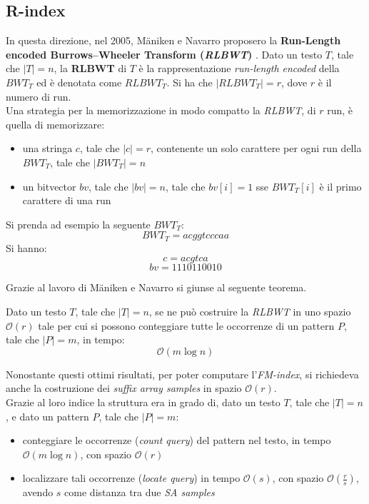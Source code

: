 \subsection{R-index}
In questa direzione, nel 2005, M\"{a}niken e Navarro proposero la
\textbf{Run-Length encoded Burrows–Wheeler Transform (\textit{RLBWT})}
\cite{rlbwt}.
Dato un testo $T$, tale che $|T|=n$, la \textbf{RLBWT} di $T$ è la
rappresentazione \textit{run-length encoded} della $BWT_T$ ed è denotata come
$RLBWT_T$. Si ha  che $|RLBWT_T|=r$, dove $r$ è il numero di run.\\
Una strategia per la memorizzazione in modo compatto la \textit{RLBWT}, di $r$
run, è quella di memorizzare:
\begin{itemize}
  \item una stringa $c$, tale che $|c|=r$, contenente un solo carattere per ogni
  run della $BWT_T$, tale che $|BWT_T|=n$
  \item un bitvector $bv$, tale che $|bv|=n$, tale che $bv[i]=1$ sse $BWT_T[i]$
  è il primo carattere di una run
\end{itemize}
\begin{esempio}
  Si prenda ad esempio la seguente $BWT_T$:
  \[BWT_T=acggtcccaa\]
  Si hanno:
  \[c=acgtca\]
  \[bv=1110110010\]
\end{esempio}
Grazie al lavoro di M\"{a}niken e Navarro si giunse al seguente teorema.
\begin{teorema}
  Dato un testo $T$, tale che $|T|=n$, se ne può costruire la \textit{RLBWT} in
  uno spazio $\mathcal{O}(r)$ tale per cui si possono conteggiare tutte le
  occorrenze di un pattern $P$, tale che $|P|=m$, in tempo:
  \[\mathcal{O}(m\log n)\]
\end{teorema}
Nonostante questi ottimi risultati, per poter computare l'\textit{FM-index}, si
richiedeva anche la costruzione dei \textit{suffix array samples} in spazio
$\mathcal{O}(r)$. \\
Grazie al loro indice la struttura era in grado di, dato un testo $T$, tale che
$|T|=n$, e dato un pattern $P$, tale che $|P|=m$: 
\begin{itemize}
  \item conteggiare le occorrenze (\textit{count query}) del pattern nel testo,
  in tempo $\mathcal{O}(m\log n)$, con spazio $\mathcal{O}(r)$  
  \item localizzare tali occorrenze (\textit{locate query}) in tempo
  $\mathcal{O}(s)$, con spazio $\mathcal{O}\left(\frac{r}{s}\right)$, avendo $s$
  come distanza tra due \textit{SA samples}
\end{itemize}
